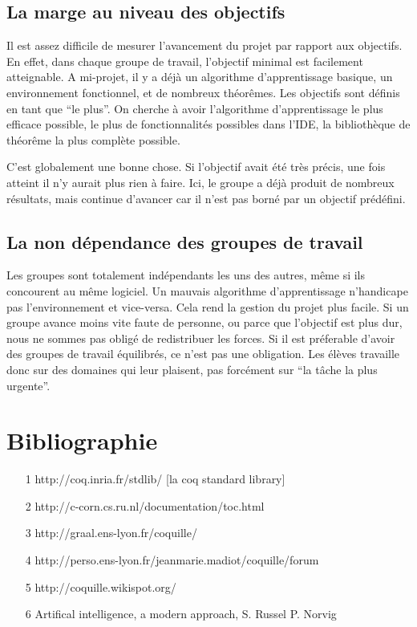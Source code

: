 \documentclass[a4paper,10pt]{article}
\begin{document}
\subsection{La marge au niveau des objectifs}
Il est assez difficile de mesurer l'avancement du projet par rapport aux objectifs. En effet, dans chaque groupe de travail, l'objectif minimal est facilement atteignable. A mi-projet, il y a déjà un algorithme d'apprentissage basique, un environnement fonctionnel, et de nombreux théorêmes. Les objectifs sont définis en tant que ``le plus''. On cherche à avoir l'algorithme d'apprentissage le plus efficace possible, le plus de fonctionnalités possibles dans l'IDE, la bibliothèque de théorême la plus complète possible.

C'est globalement une bonne chose. Si l'objectif avait été très précis, une fois atteint il n'y aurait plus rien à faire. Ici, le groupe a déjà produit de nombreux résultats, mais continue d'avancer car il n'est pas borné par un objectif prédéfini.

\subsection{La non dépendance des groupes de travail}
Les groupes sont totalement indépendants les uns des autres, même si ils concourent au même logiciel. Un mauvais algorithme d'apprentissage n'handicape pas l'environnement et vice-versa. Cela rend la gestion du projet plus facile. Si un groupe avance moins vite faute de personne, ou parce que l'objectif est plus dur, nous ne sommes pas obligé de redistribuer les forces. Si il est préferable d'avoir des groupes de travail équilibrés, ce n'est pas une obligation. Les élèves travaille donc sur des domaines qui leur plaisent, pas forcément sur ``la tâche la plus urgente''.


\section{Bibliographie}
\begin{itemize}
\item [1] http://coq.inria.fr/stdlib/ [la coq standard library]
\item [2] http://c-corn.cs.ru.nl/documentation/toc.html%
\item [3] http://graal.ens-lyon.fr/coquille/
\item [4] http://perso.ens-lyon.fr/jeanmarie.madiot/coquille/forum
\item [5] http://coquille.wikispot.org/
\item [6] Artifical intelligence, a modern approach, S. Russel P. Norvig

\end{itemize}

\end{document}
